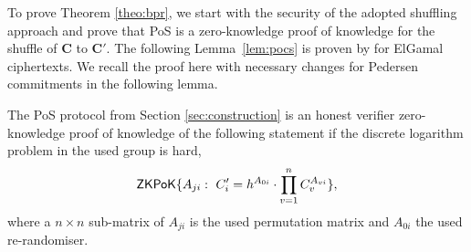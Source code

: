 \noindent
To prove Theorem \ref{theo:bpr}, we start with the security of the adopted shuffling approach and prove that \ac{PoS} is a zero-knowledge proof of knowledge for the shuffle of $\bm C$ to $\bm C'$.
The following Lemma~\ref{lem:pocs} is proven by \citet{Furukawa05} for ElGamal ciphertexts.
We recall the proof here with necessary changes for Pedersen commitments in the following lemma.

\begin{lemma} \label{lem:pocs}
  The \ac{PoS} protocol from Section \ref{sec:construction} is an honest verifier zero-knowledge proof of knowledge of the following statement if the discrete logarithm problem in the used group is hard,
  \[\mathsf{ZKPoK}\{A_{ji}:~ C'_i=h^{A_{0i}}\cdot\prod_{v=1}^n C_v^{A_{vi}}\},\]
  where a $n\times n$ sub-matrix of $A_{ji}$ is the used permutation matrix and $A_{0i}$ the used re-randomiser.
\end{lemma}

